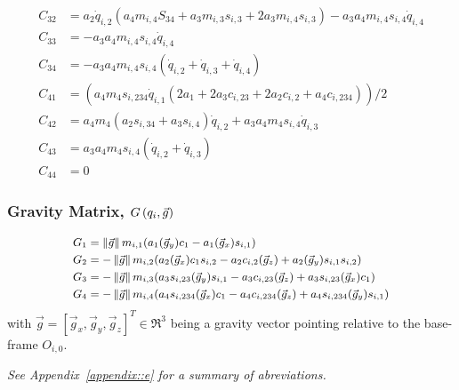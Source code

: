 \begin{equation*}
\begin{split}
	    C_{32} 	& = a_{2} \dot{q}_{i,2} (a_{4} m_{i,4} S_{34} + a_{3} m_{i,3} s_{i,3} + 2 a_{3} m_{i,4} s_{i,3}) - a_{3} a_{4} m_{i,4} s_{i,4} \dot{q}_{i,4}\\
	   	C_{33} 	& =  -a_{3} a_{4} m_{i,4} s_{i,4} \dot{q}_{i,4}\\
	    C_{34} 	& = -a_{3} a_{4} m_{i,4} s_{i,4} (\dot{q}_{i,2} + \dot{q}_{i,3} + \dot{q}_{i,4})\\
	    C_{41} 	& = (a_{4} m_{4} s_{i,234} \dot{q}_{i,1} (2 a_{1} + 2 a_{3} c_{i,23} + 2 a_{2} c_{i,2} + a_{4} c_{i,234}))/2\\
	    C_{42} 	& = a_{4} m_{4} (a_{2} s_{i,34} + a_{3} s_{i,4}) \dot{q}_{i,2} + a_{3} a_{4} m_{4} s_{i,4} \dot{q}_{i,3}\\
	    C_{43} 	& = a_{3} a_{4} m_{4} s_{i,4} (\dot{q}_{i,2} + \dot{q}_{i,3})\\
	    C_{44} 	& = 0
		\end{split}
	\end{equation*}

	\subsubsection{Gravity Matrix, $G\left(q_{i},\vec{g}\right)$}
	\begin{equation*}\small
		\begin{split}
		G_{1}  &=  \left\lVert\vec{g}\right\rVert m_{i,1} (a_{1} (\vec{g}_{y}) c_{1} - a_{1} (\vec{g}_{x}) s_{i,1}) \\
		G_{2}  &= -\left\lVert\vec{g}\right\rVert m_{i,2} (a_{2} (\vec{g}_{x}) c_{1} s_{i,2} - a_{2} c_{i,2} (\vec{g}_{z}) + a_{2} (\vec{g}_{y}) s_{i,1} s_{i,2}) \\
		G_{3}  &= -\left\lVert\vec{g}\right\rVert m_{i,3} (a_{3} s_{i,23} (\vec{g}_{y}) s_{i,1} - a_{3} c_{i,23} (\vec{g}_{z}) + a_{3} s_{i,23} (\vec{g}_{x}) c_{1}) \\
		G_{4}  &= -\left\lVert\vec{g}\right\rVert m_{i,4} (a_{4} s_{i,234} (\vec{g}_{x}) c_{1} - a_{4} c_{i,234} (\vec{g}_{z}) + a_{4} s_{i,234} (\vec{g}_{y}) s_{i,1})
		\end{split}
	\end{equation*}
	with $\vec{g} = [\vec{g}_{x},\vec{g}_{y},\vec{g}_{z}]^{T} \in \Re^{3}$ being a gravity vector pointing relative to the base-frame $O_{i,0}$.

	\vspace{10mm}
	\noindent
	\emph{See Appendix~\ref{appendix::e} for a summary of abreviations.}